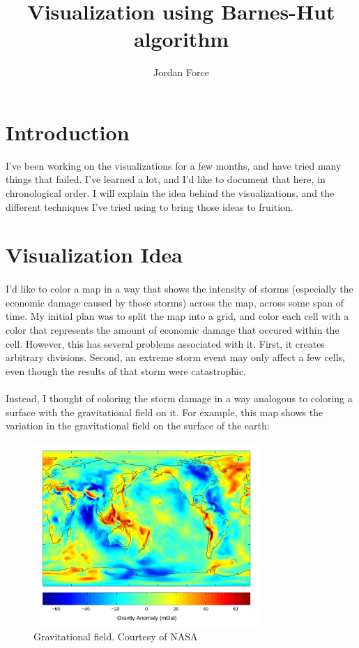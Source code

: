 \documentclass[a4paper]{article}
\title{Visualization using Barnes-Hut algorithm}
\author{Jordan Force}
\begin{document}
\maketitle


\section{Introduction}
I've been working on the visualizations for a few months, and have tried many things that failed. I've learned a lot, and I'd like to document that here, in chronological order. I will explain the idea behind the visualizations, and the different techniques I've tried using to bring those ideas to fruition.

\section{Visualization Idea}

\paragraph{} I'd like to color a map in a way that shows the intensity of storms (especially the economic damage caused by those storms) across the map, across some span of time. My initial plan was to split the map into a grid, and color each cell with a color that represents the amount of economic damage that occured within the cell. However, this has several problems associated with it. First, it creates arbitrary divisions. Second, an extreme storm event may only affect a few cells, even though the results of that storm were catastrophic.  

\paragraph{}Instead, I thought of coloring the storm damage in a way analogous to coloring a surface with the gravitational field on it. For example, this map shows the variation in the gravitational field on the surface of the earth:

\begin{figure}[H]
  \centering
  \includegraphics[width=0.77\textwidth]{earth_gravity}
  \caption{Gravitational field. Courtesy of NASA \cite{nasa:gravity}}
\end{figure} 
\end{document}
